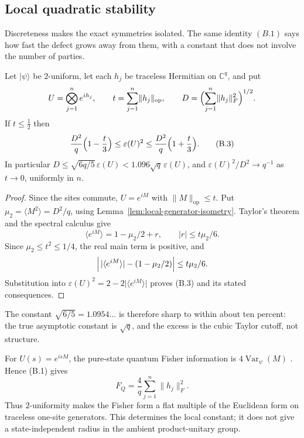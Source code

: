 \subsection{Local quadratic stability}

Discreteness makes the exact symmetries isolated.  The same identity
\((B.1)\) says how fast the defect grows away from them, with a constant
that does not involve the number of parties.

\begin{theorem}\label{thm:two-uniform-stability}
Let \(\lvert\psi\rangle\) be \(2\)-uniform, let each \(h_j\) be traceless
Hermitian on \(\mathbb C^q\), and put
\[
 U=\bigotimes_{j=1}^ne^{ih_j},\qquad
 t=\sum_{j=1}^n\lVert h_j\rVert_{\mathrm{op}},\qquad
 D=\Bigl(\sum_{j=1}^n\lVert h_j\rVert_F^2\Bigr)^{1/2}.
\]
If \(t\leq\frac12\) then
\[
 \frac{D^2}q\Bigl(1-\frac t3\Bigr)\leq\varepsilon(U)^2
 \leq\frac{D^2}q\Bigl(1+\frac t3\Bigr).                  \tag{B.3}
\]
In particular \(D\leq\sqrt{6q/5}\,\varepsilon(U)<1.096\sqrt q\,
\varepsilon(U)\), and \(\varepsilon(U)^2/D^2\to q^{-1}\) as \(t\to0\),
uniformly in \(n\).
\end{theorem}

\begin{proof}
Since the sites commute, \(U=e^{iM}\) with
\(\lVert M\rVert_{\mathrm{op}}\leq t\).  Put
\(\mu_2=\langle M^2\rangle=D^2/q\), using
Lemma~\ref{lem:local-generator-isometry}.  Taylor's theorem and the spectral
calculus give
\[
 \langle e^{iM}\rangle=1-\mu_2/2+r,\qquad |r|\leq t\mu_2/6.
\]
Since \(\mu_2\leq t^2\leq1/4\), the real main term is positive, and
\[
 \Bigl\lvert\,\lvert\langle e^{iM}\rangle\rvert
   -(1-\mu_2/2)\Bigr\rvert\leq t\mu_2/6 .
\]
Substitution into
\(\varepsilon(U)^2=2-2\lvert\langle e^{iM}\rangle\rvert\) proves (B.3)
and its stated consequences.
\end{proof}

The constant \(\sqrt{6/5}=1.0954\ldots\) is therefore sharp to within about
ten percent: the true asymptotic constant is \(\sqrt q\), and the excess is
the cubic Taylor cutoff, not structure.

\begin{remark}
\label{rem:fisher-isotropy}
For \(U(s)=e^{isM}\), the pure-state quantum Fisher information is
\(4\operatorname{Var}_\psi(M)\) \cite{BraunsteinCaves1994}.  Hence (B.1)
gives
\[
 F_Q=\frac4q\sum_{j=1}^n\lVert h_j\rVert_F^2 .
\]
Thus \(2\)-uniformity makes the Fisher form a flat multiple of the Euclidean
form on traceless one-site generators.  This determines the local constant;
it does not give a state-independent radius in the ambient product-unitary
group.
\end{remark}

